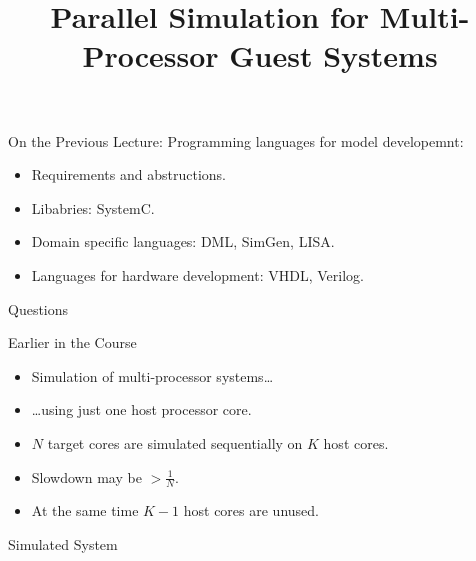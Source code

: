 

\title{Parallel Simulation for Multi-Processor Guest Systems}



\startslides

\begin{frame}{On the Previous Lecture:}
  Programming languages for model developemnt:
  \begin{itemize}
    \item Requirements and abstructions.
    \item Libabries: SystemC.
    \item Domain specific languages: DML, SimGen, LISA.
    \item Languages for hardware development: VHDL, Verilog.
  \end{itemize}
\end{frame}

\begin{frame}{Questions}
\end{frame}

\begin{frame}{Earlier in the Course}
  \begin{itemize}
   \item Simulation of multi-processor systems\dots\pause
   \item \dots using just one host processor core.
   \vfill
   \item $N$ target cores are simulated sequentially on $K$ host cores.
   \item Slowdown may be $> \frac{1}{N}$.
   \item At the same time $K-1$ host cores are unused.
  \end{itemize}
\end{frame}

\begin{frame}{Simulated System}
  \centering
\end{frame}


